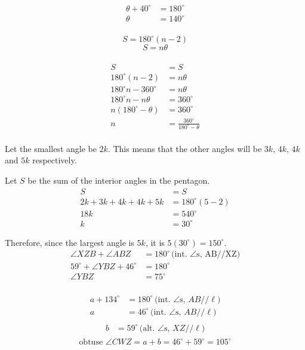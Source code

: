 \documentclass{article}
\begin{document}
\[\begin{aligned}
	\theta+40^\circ&=180^\circ\\
	\theta&=140^\circ\\
\end{aligned}\]

\[S=180^\circ(n-2)\]
\[S=n\theta\]
\\
\[\begin{aligned}
	S&=S\\
	180^\circ(n-2)&=n\theta\\
	180^\circ n-360^\circ&=n\theta\\
	180^\circ n-n\theta&=360^\circ\\
	n\left(180^\circ-\theta\right)&=360^\circ\\
	n&=\frac{360^\circ}{180^\circ-\theta}\\
\end{aligned}\]

Let the smallest angle be \(2k\). This means that the other angles will be \(3k\), \(4k\), \(4k\) and \(5k\) respectively.

Let \(S\) be the sum of the interior angles in the pentagon.
\[\begin{aligned}
	S&=S\\
	2k+3k+4k+4k+5k&=180^\circ(5-2)\\
	18k&=540^\circ\\
	k&=30^\circ
\end{aligned}\]

Therefore, since the largest angle is \(5k\), it is \(5(30^\circ)=150^\circ\).
\\
\newpage
\[\begin{aligned}
	\angle XZB+\angle ABZ&=180^\circ\,\text{(int. }\angle\text{s, AB//XZ)}\\
	59^\circ+\angle YBZ+46^\circ&=180^\circ\\
	\angle YBZ&=\boxed{75^\circ}\\
\end{aligned}\]

\[\begin{aligned}
	a+134^\circ&=180^\circ\,\text{(int. }\angle\text{s},\,AB//\ell)\\
	a&=46^\circ\,\text{(int. }\angle\text{s},\,AB//\ell)\\
\end{aligned}\]
\[\begin{aligned}
	b&=59^\circ\,\text{(alt. }\angle\text{s},\,XZ//\ell)\\
\end{aligned}\]
\[\text{obtuse }\angle CWZ=a+b=46^\circ+59^\circ=\boxed{105^\circ}\]
\end{document}
